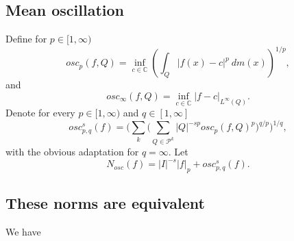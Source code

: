 \documentclass{amsart}
\theoremstyle{definition}
\begin{document}
 \subsection{Mean oscillation}
 Define for $p\in [1,\infty)$
$$osc_p(f,Q)= \inf_{c \in \mathbb{C}} (\int_Q |f(x)-c|^p \ dm(x) )^{1/p},$$
and 
$$osc_\infty(f,Q)=\inf_{c \in \mathbb{C}} |f-c|_{L^\infty(Q)}.$$
Denote for every $p\in [1,\infty)$ and $q \in [1,\infty]$
\begin{equation} \label{oc} osc^s_{p,q}(f)= \Big(  \sum_k \big(  \sum_{Q\in \mathcal{P}^k} |Q|^{-sp} osc_p(f,Q)^p  \big)^{q/p} \Big)^{1/q},\end{equation} 
with the obvious adaptation for $q=\infty$.  Let $$ N_{osc}(f)=|I|^{-s}|f|_p+osc^s_{p,q}(f).$$
 
 

 \subsection{These norms are equivalent} We have 
 
\end{document}
